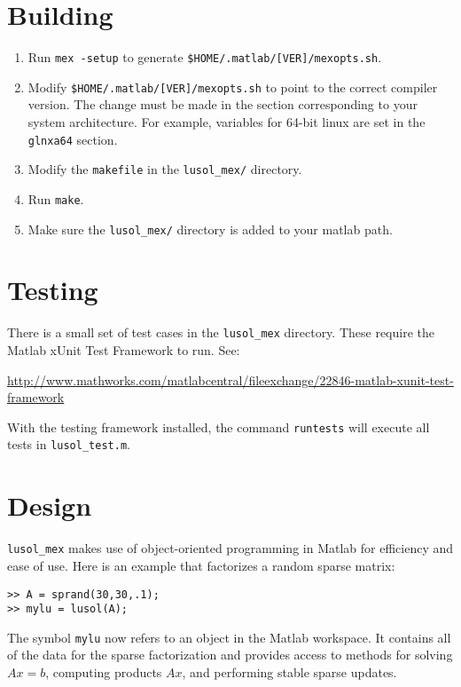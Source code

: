 \documentclass[11pt]{article}
\newcommand{\lmex}{\texttt{lusol\_mex}\xspace}
\begin{document}
\section{Building}

\begin{enumerate}
\item Run \texttt{mex -setup} to generate
  \texttt{\$HOME/.matlab/[VER]/mexopts.sh}.
\item Modify \texttt{\$HOME/.matlab/[VER]/mexopts.sh} to point to the correct
  compiler version.  The change must be made in the section corresponding to
  your system architecture.  For example, variables for 64-bit linux are set in
  the \texttt{glnxa64} section.
\item Modify the \texttt{makefile} in the \texttt{lusol\_mex/} directory.
\item Run \texttt{make}.
\item Make sure the \texttt{lusol\_mex/} directory is added to your matlab
  path.
\end{enumerate}

\section{Testing}

There is a small set of test cases in the \lmex directory.  These require the
Matlab xUnit Test Framework to run.  See:

\begin{center}
\url{http://www.mathworks.com/matlabcentral/fileexchange/22846-matlab-xunit-test-framework}
\end{center}

With the testing framework installed, the command \texttt{runtests} will
execute all tests in \texttt{lusol\_test.m}.

\section{Design}

\lmex makes use of object-oriented programming in Matlab for efficiency and
ease of use.  Here is an example that factorizes a random sparse matrix:

\begin{verbatim}
>> A = sprand(30,30,.1);
>> mylu = lusol(A);
\end{verbatim}

The symbol \texttt{mylu} now refers to an object in the Matlab workspace.  It
contains all of the data for the sparse factorization and provides access to
methods for solving $Ax=b$, computing products $Ax$, and performing stable
sparse updates.
\end{document}
